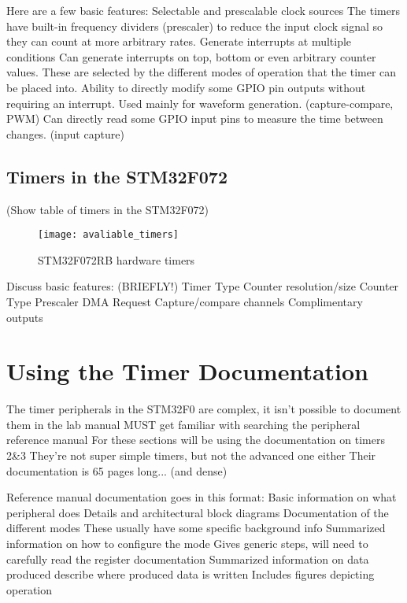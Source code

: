 \documentclass[11pt,fleqn]{book} %
\begin{document}
        Here are a few basic features:
            Selectable and prescalable clock sources
                The timers have built-in frequency dividers (prescaler) to reduce the input clock signal so they can count at more arbitrary rates. 
            Generate interrupts at multiple conditions 
                Can generate interrupts on top, bottom or even arbitrary counter values. 
                These are selected by the different modes of operation that the timer can be placed into. 
        Ability to directly modify some GPIO pin outputs without requiring an interrupt. Used mainly for waveform generation. (capture-compare, PWM)
        Can directly read some GPIO input pins to measure the time between changes. (input capture)	
    
    \subsection{Timers in the STM32F072}
        (Show table of timers in the STM32F072)
        \begin{figure}[]
            \centering\texttt{[image: avaliable\_timers]}
            \caption{STM32F072RB hardware timers}
            \label{avaliable_timers}
        \end{figure}
        
        Discuss basic features: (BRIEFLY!)
            Timer Type
            Counter resolution/size
            Counter Type
            Prescaler
            DMA Request
            Capture/compare channels
            Complimentary outputs
    

\section{Using the Timer Documentation}
    The timer peripherals in the STM32F0 are complex, it isn't possible to document them in the lab manual
    MUST get familiar with searching the peripheral reference manual
    For these sections will be using the documentation on timers 2\&3 
        They're not super simple timers, but not the advanced one either
        Their documentation is 65 pages long... (and dense)
    
    Reference manual documentation goes in this format:
        Basic information on what peripheral does
        Details and architectural block diagrams
        Documentation of the different modes
        These usually have some specific background info
        Summarized information on how to configure the mode
            Gives generic steps, will need to carefully read the register documentation
        Summarized information on data produced 
            describe where produced data is written
            Includes figures depicting operation
    
\end{document}
